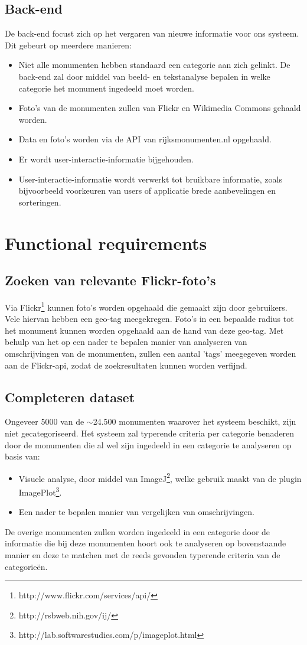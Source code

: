 \documentclass[a4paper,10pt]{article}
\begin{document}
		\subsection{Back-end}
			De back-end focust zich op het vergaren van nieuwe informatie voor ons systeem. Dit gebeurt op meerdere manieren:
			\begin{itemize}
				\item Niet alle monumenten hebben standaard een categorie aan zich gelinkt. De back-end zal door middel van beeld- en tekstanalyse bepalen in welke categorie het monument ingedeeld moet worden.
				\item Foto's van de monumenten zullen van Flickr en Wikimedia Commons gehaald worden.
				\item Data en foto's worden via de API van rijksmonumenten.nl opgehaald.
				\item Er wordt user-interactie-informatie bijgehouden.
				\item User-interactie-informatie wordt verwerkt tot bruikbare informatie, zoals bijvoorbeeld voorkeuren van users of applicatie brede aanbevelingen en sorteringen.
			\end{itemize}
			
		\clearpage
		\section{Functional requirements}
			\subsection{Zoeken van relevante Flickr-foto's}
			Via Flickr\footnote{http://www.flickr.com/services/api/} kunnen foto's worden opgehaald die gemaakt zijn door gebruikers. Vele hiervan hebben een geo-tag meegekregen. Foto's in een bepaalde radius tot het monument kunnen worden opgehaald aan de hand van deze geo-tag. Met behulp van het op een nader te bepalen manier van analyseren van omschrijvingen van de monumenten, zullen een aantal 'tags' meegegeven worden aan de Flickr-api, zodat de zoekresultaten kunnen worden verfijnd.
			
			\subsection{Completeren dataset}
			Ongeveer 5000 van de $\sim$24.500 monumenten waarover het systeem beschikt, zijn niet gecategoriseerd. Het systeem zal typerende criteria per categorie benaderen door de monumenten die al wel zijn ingedeeld in een categorie te analyseren op basis van:
				\begin{itemize}
					\item Visuele analyse, door middel van ImageJ\footnote{http://rsbweb.nih.gov/ij/}, welke gebruik maakt van de plugin ImagePlot\footnote{http://lab.softwarestudies.com/p/imageplot.html}.
					\item Een nader te bepalen manier van vergelijken van omschrijvingen.
				\end{itemize}
			De overige monumenten zullen worden ingedeeld in een categorie door de informatie die bij deze monumenten hoort ook te analyseren op bovenstaande manier en deze te matchen met de reeds gevonden typerende criteria van de categorie\"en.
	
\end{document}
